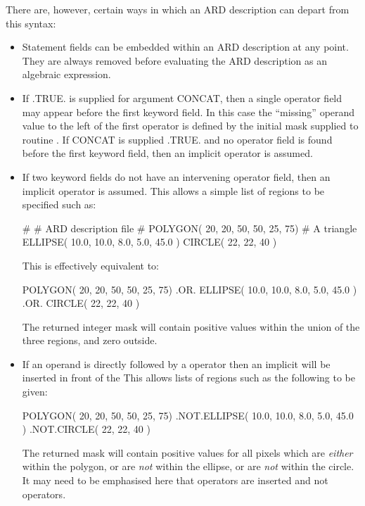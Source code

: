 \documentclass[11pt]{starlink}
\begin{document}
There are, however, certain ways in which an ARD description can depart from
this syntax:

\begin{itemize}

\item Statement fields can be embedded within an ARD description at any point.
They are always removed before evaluating the ARD description as an algebraic
expression.

\item If .TRUE. is supplied for  argument CONCAT, then a single
operator field may appear before the first keyword field. In this case the
``missing'' operand value to the left of the first operator is defined by the
initial mask supplied to routine . If CONCAT is supplied .TRUE. and no
operator field is found before the first keyword field, then an implicit 
operator is assumed.

\item If two keyword fields do not have an intervening operator field, then an
implicit  operator is assumed. This allows a simple list of regions to
be specified such as:

\small
\begin{terminalv}
   #
   #  ARD description file
   #
   POLYGON( 20, 20, 50, 50, 25, 75)      # A triangle
   ELLIPSE( 10.0, 10.0, 8.0, 5.0, 45.0 )
   CIRCLE( 22, 22, 40 )
\end{terminalv}
\normalsize

This is effectively equivalent to:

\small
\begin{terminalv}
   POLYGON( 20, 20, 50, 50, 25, 75) .OR.
   ELLIPSE( 10.0, 10.0, 8.0, 5.0, 45.0 ) .OR.
   CIRCLE( 22, 22, 40 )
\end{terminalv}
\normalsize

The returned integer mask will contain positive values within the union of the
three regions, and zero outside.

\item If an operand is directly followed by a  operator then an implicit
 will be inserted in front of the  This allows lists of regions such
as the following to be given:

\small
\begin{terminalv}
   POLYGON( 20, 20, 50, 50, 25, 75)
   .NOT.ELLIPSE( 10.0, 10.0, 8.0, 5.0, 45.0 )
   .NOT.CIRCLE( 22, 22, 40 )
\end{terminalv}
\normalsize

The returned mask will contain positive values for all pixels which are
\emph{either} within the polygon, or are \emph{not} within the ellipse, or are
\emph{not} within the circle. It may need to be emphasised here that  operators
are inserted and not  operators.

\end{itemize}
\end{document}
